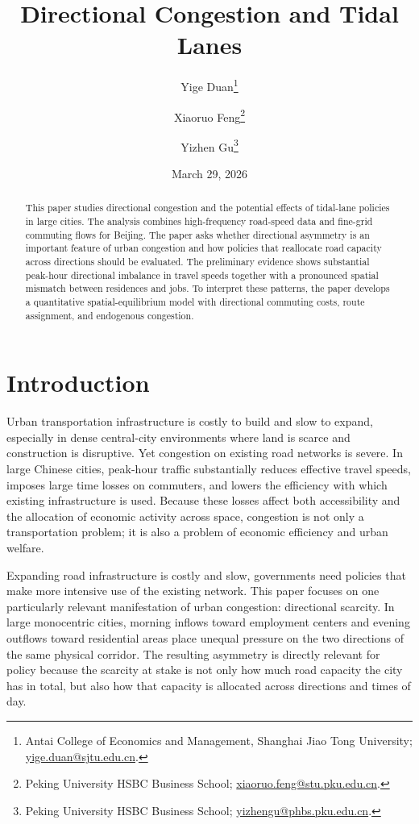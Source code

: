 \documentclass[12pt]{article}
\title{Directional Congestion and Tidal Lanes}
\author{
Yige Duan\thanks{Antai College of Economics and Management, Shanghai Jiao Tong University; \href{mailto:yige.duan@sjtu.edu.cn}{yige.duan@sjtu.edu.cn}.}
\and
Xiaoruo Feng\thanks{Peking University HSBC Business School; \href{mailto:xiaoruo.feng@stu.pku.edu.cn}{xiaoruo.feng@stu.pku.edu.cn}.}
\and
Yizhen Gu\thanks{Peking University HSBC Business School; \href{mailto:yizhengu@phbs.pku.edu.cn}{yizhengu@phbs.pku.edu.cn}.}
}
\date{March 29, 2026}
\begin{document}
\maketitle

\begin{abstract}
This paper studies directional congestion and the potential effects of tidal-lane policies in large cities. The analysis combines high-frequency road-speed data and fine-grid commuting flows for Beijing. The paper asks whether directional asymmetry is an important feature of urban congestion and how policies that reallocate road capacity across directions should be evaluated. The preliminary evidence shows substantial peak-hour directional imbalance in travel speeds together with a pronounced spatial mismatch between residences and jobs. To interpret these patterns, the paper develops a quantitative spatial-equilibrium model with directional commuting costs, route assignment, and endogenous congestion.
\end{abstract}

\section{Introduction}
Urban transportation infrastructure is costly to build and slow to expand, especially in dense central-city environments where land is scarce and construction is disruptive. Yet congestion on existing road networks is severe. In large Chinese cities, peak-hour traffic substantially reduces effective travel speeds, imposes large time losses on commuters, and lowers the efficiency with which existing infrastructure is used. Because these losses affect both accessibility and the allocation of economic activity across space, congestion is not only a transportation problem; it is also a problem of economic efficiency and urban welfare.

Expanding road infrastructure is costly and slow, governments need policies that make more intensive use of the existing network. This paper focuses on one particularly relevant manifestation of urban congestion: directional scarcity. In large monocentric cities, morning inflows toward employment centers and evening outflows toward residential areas place unequal pressure on the two directions of the same physical corridor. The resulting asymmetry is directly relevant for policy because the scarcity at stake is not only how much road capacity the city has in total, but also how that capacity is allocated across directions and times of day.
\end{document}
